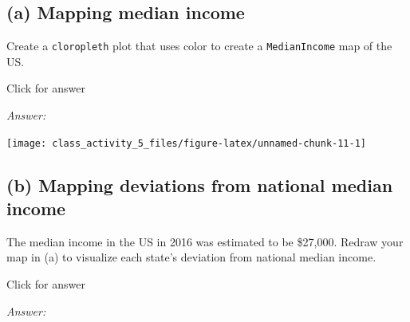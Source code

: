 \documentclass[
]{book}
\newenvironment{Shaded}{\begin{snugshade}}{\end{snugshade}}
\newcommand{\AttributeTok}[1]{\textcolor[rgb]{0.77,0.63,0.00}{#1}}
\newcommand{\CommentTok}[1]{\textcolor[rgb]{0.56,0.35,0.01}{\textit{#1}}}
\newcommand{\DecValTok}[1]{\textcolor[rgb]{0.00,0.00,0.81}{#1}}
\newcommand{\FunctionTok}[1]{\textcolor[rgb]{0.00,0.00,0.00}{#1}}
\newcommand{\NormalTok}[1]{#1}
\newcommand{\SpecialCharTok}[1]{\textcolor[rgb]{0.00,0.00,0.00}{#1}}
\newcommand{\StringTok}[1]{\textcolor[rgb]{0.31,0.60,0.02}{#1}}
\begin{document}
\hypertarget{a-mapping-median-income}{%
\subsection{(a) Mapping median income}\label{a-mapping-median-income}}

Create a \texttt{cloropleth} plot that uses color to create a \texttt{MedianIncome} map of the US.

Click for answer

\emph{Answer:}

\begin{Shaded}
\end{Shaded}

\texttt{[image: class\_activity\_5\_files/figure-latex/unnamed-chunk-11-1]}

\hypertarget{b-mapping-deviations-from-national-median-income}{%
\subsection{(b) Mapping deviations from national median income}\label{b-mapping-deviations-from-national-median-income}}

The median income in the US in 2016 was estimated to be \$27,000. Redraw your map in (a) to visualize each state's deviation from national median income.

Click for answer

\emph{Answer:}

\begin{Shaded}
\end{Shaded}
\end{document}
